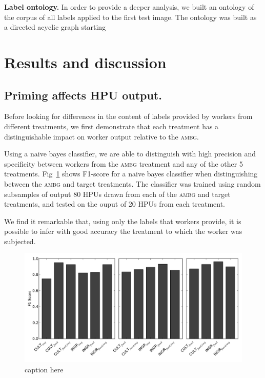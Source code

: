 \documentclass[letterpaper, 11pt, twocolumn]{article}
\begin{document}
\textbf{Label ontology.}
In order to provide a deeper analysis, we built an ontology
of the corpus of all labels applied to the first test image.  The ontology
was built as a directed acyclic graph starting 

\section*{Results and discussion}

\subsection*{Priming affects HPU output.}
Before looking for differences in the content of labels provided by workers
from different treatments, we first demonstrate that each treatment has a
distinguishable impact on worker output relative to the \textsc{ambg}.

Using a naive bayes classifier, we are able to distinguish with high precision
and specificity between workers from the \textsc{ambg} treatment and any of
the other 5 treatments.  Fig~\ref{fig:classifier} shows F1-score for a
naive bayes classifier when distinguishing between the \textsc{ambg} and 
target treatments. The classifier was trained using random subsamples of 
output 80 HPUs drawn from each of the \textsc{ambg} and target treatments, and
tested on the ouput of 20 HPUs from each treatment.

We find it remarkable that, using only the labels that workers provide, it is
possible to infer with good accuracy the treatment to which the worker was 
subjected.

\begin{figure}
	\includegraphics[scale=0.65]{../figs/f1scores.pdf}
	\caption{caption here}
	\label{fig:classifier}
\end{figure}
\end{document}
